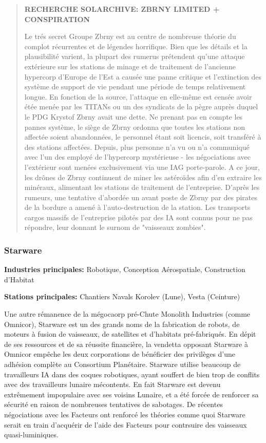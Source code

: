 \begin{quotation} \textbf{RECHERCHE SOLARCHIVE: ZBRNY LIMITED + CONSPIRATION} 

Le trés secret Groupe Zbrny est au centre de nombreuse théorie du complot récurrentes et de légendes horrifique. Bien que les détails et la plausibilité varient, la plupart des rumerus prétendent qu'une attaque extérieure sur les stations de minage et de traitement de l'ancienne hypercorp d'Europe de l'Est a causée une panne critique et l'extinction des système de support de vie pendant une période de temps relativement longue. En fonction de la source, l'attaque en elle-même est censée avoir étée menée par les TITANs ou un des syndicats de la pègre auprès duquel le PDG Krystof Zbrny avait une dette. Ne prenant pas en compte les pannes système, le siège de Zbrny ordonna que toutes les stations non affectée soient abandonnées, le personnel étant soit licencis, soit transféré à des stations affectées. Depuis, plus personne n'a vu ou n'a communiqué avec l'un des employé de l'hypercorp mystérieuse - les négociations avec l'extérieur sont menées exclusivement via une IAG porte-parole. A ce jour, les drônes de Zbrny continuent de miner les astéroïdes afin d'en extraire les minéraux, alimentant les stations de traitement de l'entreprise. D'après les rumeurs, une tentative d'abordée un avant poste de Zbrny par des pirates de la bordure a amené à l'auto-destruction de la station. Les transports cargos massifs de l'entreprise pilotés par des IA sont connus pour ne pas répondre, leur donnant le surnom de "vaisseaux zombies". \end{quotation} 

\subsubsection{Starware} \label{sec:starware} 

\textbf{Industries principales:} Robotique, Conception Aérospatiale, Construction d'Habitat 

\textbf{Stations principales:} Chantiers Navals Korolev (Lune), Vesta (Ceinture) 

Une autre rémanence de la mégocaorp pré-Chute Monolith Industries (comme Omnicor), Starware est un des grands noms de la fabrication de robots, de moteurs à fusion de vaisseaux, de satellites et d'habitats pré-fabriqués. En dépit de ses ressources et de sa réussite financière, la vendetta opposant Starware à Omnicor empêche les deux corporations de bénéficier des privilèges d'une adhésion complète au Consortium Planétaire. Starware utilise beaucoup de travailleurs IA dans des coques robotiques, ayant souffert de bien trop de conflits avec des travailleurs lunaire mécontents. En fait Starware est devenu extrêmement impopulaire avec ses voisins Lunaire, et a été forcée de renforcer sa sécurité en raison de nombreuses tentatives de sabotages. De récentes négociations avec les Facteurs ont renforcé les théories comme quoi Starware serait en train d'acquérir de l'aide des Facteurs pour contrsuire des vaisseaux quasi-luminiques. 

